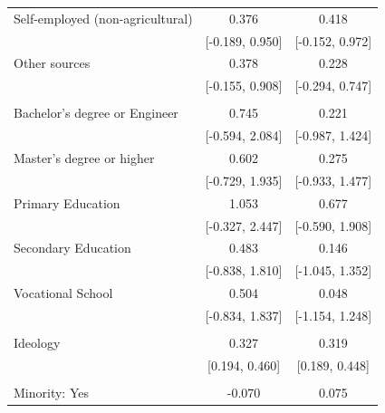 \documentclass[
  10,
  letterpaper,
  DIV=11,
  numbers=noendperiod]{scrartcl}
\begin{document}
\begin{table}
\begin{tabular}[t]{lcc}
\hspace{1em}Self-employed (non-agricultural) & 0.376 & 0.418\\
\hspace{1em} & {}[-0.189, 0.950] & {}[-0.152, 0.972]\\
\hspace{1em}Other sources & 0.378 & 0.228\\
\hspace{1em} & {}[-0.155, 0.908] & {}[-0.294, 0.747]\\
\addlinespace[0.3em]
\multicolumn{3}{l}{\cellcolor[HTML]{3498DB}{\textbf{Education}}}\\
\hspace{1em}Bachelor's degree or Engineer & 0.745 & 0.221\\
\hspace{1em} & {}[-0.594, 2.084] & {}[-0.987, 1.424]\\
\hspace{1em}Master's degree or higher & 0.602 & 0.275\\
\hspace{1em} & {}[-0.729, 1.935] & {}[-0.933, 1.477]\\
\hspace{1em}Primary Education & 1.053 & 0.677\\
\hspace{1em} & {}[-0.327, 2.447] & {}[-0.590, 1.908]\\
\hspace{1em}Secondary Education & 0.483 & 0.146\\
\hspace{1em} & {}[-0.838, 1.810] & {}[-1.045, 1.352]\\
\hspace{1em}Vocational School & 0.504 & 0.048\\
\hspace{1em} & {}[-0.834, 1.837] & {}[-1.154, 1.248]\\
\addlinespace[0.3em]
\multicolumn{3}{l}{\cellcolor[HTML]{3498DB}{\textbf{Ideology}}}\\
\hspace{1em}Ideology & 0.327 & 0.319\\
\hspace{1em} & {}[0.194, 0.460] & {}[0.189, 0.448]\\
\addlinespace[0.3em]
\multicolumn{3}{l}{\cellcolor[HTML]{3498DB}{\textbf{Minority}}}\\
\hspace{1em}Minority: Yes & -0.070 & 0.075\\

\end{tabular}
\end{table}
\end{document}
